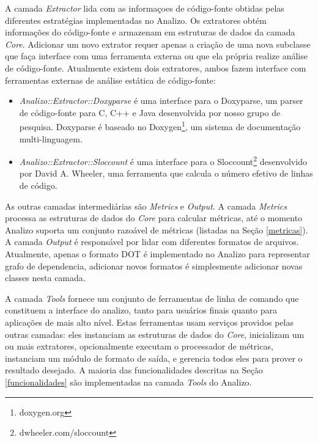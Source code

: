A camada {\it Extractor} lida com as informaçoes de código-fonte obtidas pelas
diferentes estratégias implementadas no Analizo. Os extratores obtém
informações do código-fonte e armazenam em estruturas de dados da camada {\it
Core}. Adicionar um novo extrator requer apenas a criação de uma nova subclasse
que faça interface com uma ferramenta externa ou que ela própria realize análise
de código-fonte. Atualmente existem dois extratores, ambos fazem interface
com ferramentas externas de análise estática de código-fonte:

\begin{itemize}

  \item {\it Analizo::Extractor::Doxyparse} é uma interface para o Doxyparse,
  um parser de código-fonte para C, C++ e Java desenvolvida por nosso grupo de
  pesquisa\cite{Costa2009}. Doxyparse é baseado no
  Doxygen\footnote{doxygen.org}, um sistema de documentação multi-linguagem.

  \item {\it Analizo::Extractor::Sloccount} é uma interface para o
  Sloccount\footnote{dwheeler.com/sloccount} desenvolvido por David A. Wheeler,
  uma ferramenta que calcula o número efetivo de linhas de código.

\end{itemize}

As outras camadas intermediárias são {\it Metrics} e {\it Output}. A camada
{\it Metrics} processa as estruturas de dados do {\it Core} para calcular
métricas, até o momento Analizo suporta um conjunto razoável de métricas
(listadas na Seção \ref{metricas}). A camada {\it Output} é responsável por
lidar com diferentes formatos de arquivos. Atualmente, apenas o formato DOT é
implementado no Analizo para representar grafo de dependencia, adicionar novos
formatos é simplesmente adicionar novas classes nesta camada.

A camada {\it Tools} fornece um conjunto de ferramentas de linha de comando que
constituem a interface do analizo, tanto para usuários finais quanto para
aplicações de mais alto nível. Estas ferramentas usam serviços providos pelas
outras camadas: eles instanciam as estruturas de dados do {\it Core},
inicializam um ou mais extratores, opcionalmente executam o processador de
métricas, instanciam um módulo de formato de saída, e gerencia todos eles para
prover o resultado desejado. A maioria das funcionalidades descritas na Seção
\ref{funcionalidades} são implementadas na camada {\it Tools} do Analizo.

